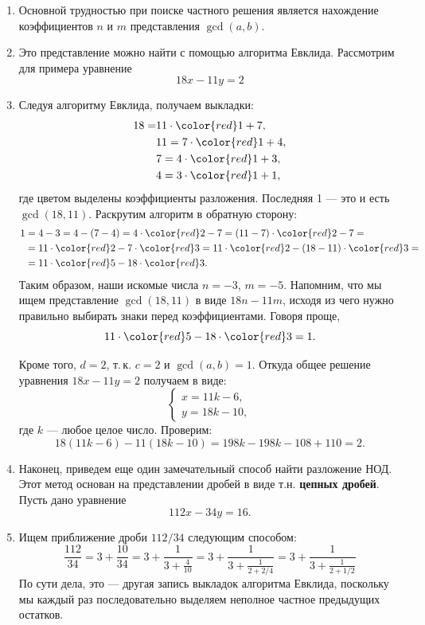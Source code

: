 \begin{enumerate}

\item Основной трудностью при поиске частного решения является нахождение коэффициентов $n$ и $m$ представления $\gcd(a,b)$.
\item Это представление можно найти с помощью алгоритма Евклида. Рассмотрим для примера уравнение
$$
18x-11y=2
$$
\item Следуя алгоритму Евклида, получаем выкладки:
\begin{align*}
18 = & 11\cdot {\color{red}1}+7,\\
   & 11 = 7\cdot {\color{red}1} + 4, \\
   & 7 = 4\cdot {\color{red}1} + 3, \\
   & 4 = 3\cdot {\color{red}1} + 1,
\end{align*}
где цветом выделены коэффициенты разложения. Последняя 1 --- это и есть $\gcd(18,11)$. Раскрутим алгоритм в обратную сторону:
\begin{align*}
1 & = 4-3 = 4 - (7-4) = 4\cdot {\color{red}2}-7 = (11-7)\cdot {\color{red}2}-7 =\\
  & = 11\cdot {\color{red}2}-7\cdot {\color{red}3} = 11\cdot {\color{red}2} - (18-11)\cdot {\color{red}3} =\\
  & = 11\cdot {\color{red}5} - 18\cdot {\color{red}3}.
\end{align*}
Таким образом, наши искомые числа $n=-3$, $m=-5$. Напомним, что мы ищем представление $\gcd(18,11)$ в виде $18n-11m$, исходя из чего нужно правильно выбирать знаки перед коэффициентами. Говоря проще,
$$
11\cdot{\color{red}5}-18\cdot{\color{red}3} = 1.
$$

Кроме того, $d=2$, т.\,к. $c=2$ и $\gcd(a,b)=1$. Откуда общее решение уравнения $18x-11y=2$ получаем в виде:
$$
\begin{cases}
x  =11k - 6, \\
y  =18k - 10,
\end{cases}
$$
где $k$ --- любое целое число. Проверим:
$$
18(11k - 6) - 11(18k - 10) = 198k-198k - 108 + 110 =2.
$$
\item Наконец, приведем еще один замечательный способ найти разложение НОД. Этот метод основан на представлении дробей в виде т.н. \textbf{цепных дробей}. Пусть дано уравнение
$$
112x-34y=16.
$$
\item Ищем приближение дроби $112/34$ следующим способом:
$$
\frac{112}{34} = 3 + \frac{10}{34} = 3 + \frac{1}{3+\frac{4}{10}} = 
3 + \frac{1}{3 + \frac{1}{2+2/4}} = 3 + \frac{1}{3 + \frac{1}{2+1/2}}
$$
По сути дела, это --- другая запись выкладок алгоритма Евклида, поскольку мы каждый раз последовательно выделяем неполное частное предыдущих остатков.


\end{enumerate}
